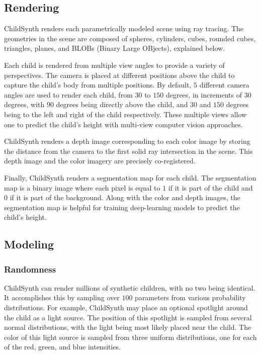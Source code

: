 \documentclass{article}
\begin{document}
\subsection{Rendering}

ChildSynth renders each parametrically modeled scene using ray tracing. The geometries in the scene are composed of spheres, cylinders, cubes, rounded cubes, triangles, planes, and BLOBs (Binary Large OBjects), explained below. 

Each child is rendered from multiple view angles to provide a variety of perspectives. The camera is placed at different positions above the child to capture the child's body from multiple positions. By default, $5$ different camera angles are used to render each child, from $30$ to $150$ degrees, in increments of $30$ degrees, with $90$ degrees being directly above the child, and $30$ and $150$ degrees being to the left and right of the child respectively. These multiple views allow one to predict the child's height with multi-view computer vision approaches.




ChildSynth renders a depth image corresponding to each color image by storing the distance from the camera to the first solid ray intersection in the scene. This depth image and the color imagery are precisely co-registered.

Finally, ChildSynth renders a segmentation map for each child. The segmentation map is a binary image where each pixel is equal to $1$ if it is part of the child and $0$ if it is part of the background. Along with the color and depth images, the segmentation map is helpful for training deep-learning models to predict the child's height.


\subsection{Modeling}

\subsubsection{Randomness}

ChildSynth can render millions of synthetic children, with no two being identical.  It accomplishes this by sampling over $100$ parameters from various probability distributions. For example, ChildSynth may place an optional spotlight around the child as a light source. The position of this spotlight is sampled from several normal distributions, with the light being most likely placed near the child. The color of this light source is sampled from three uniform distributions, one for each of the red, green, and blue intensities. 
\end{document}
